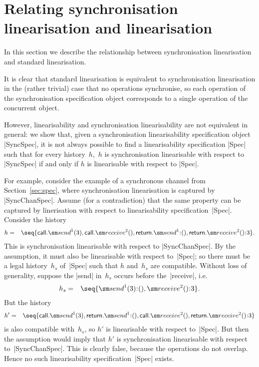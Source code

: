 \section{Relating synchronisation linearisation and linearisation}
\label{sec:relating}

In this section we describe the relationship between synchronisation
linearisation and standard linearisation.  

It is clear that standard linearisation is equivalent to synchronisation
linearisation in the (rather trivial) case that no operations synchronise, so
each operation of the synchronisation specification object corresponds to a
single operation of the concurrent object. 


However, linearisability and synchronisation linearisability are not
equivalent in general: we show that, given a synchronisation linearisability
specification object |SyncSpec|, it is not always possible to find a
linearisability specification |Spec| such that for every history~$h$,\, $h$ is
synchronisation linearisable with respect to |SyncSpec| if and only if $h$ is
linearisable with respect to |Spec|.

For example, consider the example of a synchronous channel from
Section~\ref{sec:spec}, where synchronisation linearisation is captured by
|SyncChanSpec|.  Assume (for a contradiction) that the same property can be
captured by linerisation with respect to linearisability specification~|Spec|.
Consider the history
\begin{eqnarray*}
h & = & \seq{ 
  \call.\send^1(3), \call.\receive^2(), 
  \return.\send^1\::(), \return.\receive^2()\::3 }.
\end{eqnarray*}
%
This is synchronisation linearisable with respect to |SyncChanSpec|.  By the
assumption, it must also be linearisable with respect to~|Spec|; so there must
be a legal history~$h_s$ of~|Spec| such that $h$ and~$h_s$ are compatible.
Without loss of generality, suppose the |send| in~$h_s$ occurs before
the~|receive|, i.e.
\begin{eqnarray*}
h_s & = & \seq{ \send^1(3)\::(), \receive^2()\::3 }.
\end{eqnarray*}
%
But the history
%
\begin{eqnarray*}
h' & = & \seq{ 
  \call.\send^1(3), \return.\send^1\::(), 
  \call.\receive^2(), \return.\receive^2()\::3 }
\end{eqnarray*}
%
is also compatible with~$h_s$, so $h'$ is linearisable with respect to~|Spec|.
But then the assumption would imply that $h'$ is synchronisation linearisable
with respect to~|SyncChanSpec|.  This is clearly false, because the operations
do not overlap.  Hence no such linearisability specification~|Spec| exists.


